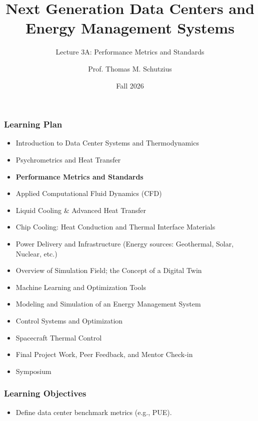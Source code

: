 \documentclass[aspectratio=169,10pt,xcolor={table,dvipsnames},t]{beamer}
\title[lecture 03]{Next Generation Data Centers and Energy Management Systems}
\subtitle{Lecture 3A: Performance Metrics and Standards}
\author{Prof. Thomas M. Schutzius}
\institute{Department of Mechanical Engineering}
\date{Fall 2026}
\begin{document}
\begin{frame}
  \titlepage
\end{frame}


{
\smallframetitle
	\begin{frame}
		\frametitle{Learning Plan}
		\begin{itemize}
			\item Introduction to Data Center Systems and Thermodynamics 
			\item Psychrometrics and Heat Transfer
			\item \textbf{Performance Metrics and Standards}
			\item Applied Computational Fluid Dynamics (CFD)
			\item Liquid Cooling \& Advanced Heat Transfer 
			\item Chip Cooling: Heat Conduction and Thermal Interface Materials 
			\item Power Delivery and Infrastructure (Energy sources: Geothermal, Solar, Nuclear, etc.)
			\item Overview of Simulation Field; the Concept of a Digital Twin 
			\item Machine Learning and Optimization Tools 
			\item Modeling and Simulation of an Energy Management System 
			\item Control Systems and Optimization 
			\item Spacecraft Thermal Control
			\item Final Project Work, Peer Feedback, and Mentor Check-in 
			\item Symposium 
		\end{itemize}		
	\end{frame}
}

{
\smallframetitle
	\begin{frame}
		\frametitle{Learning Objectives}
		\begin{itemize}
			\item Define data center benchmark metrics (e.g., PUE).
		\end{itemize}		
	\end{frame}
}
\end{document}
